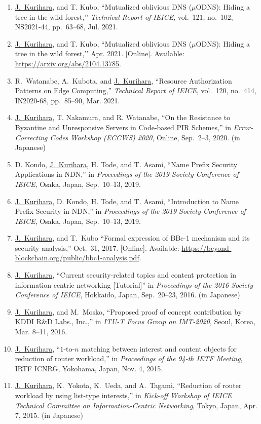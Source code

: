 \begin{enumerate}
 \item \underline{J.~Kurihara}, and T. Kubo, ``Mutualized oblivious DNS ($\mu$ODNS): Hiding a tree in the wild forest,’’ \textit{Technical Report of IEICE}, vol.~121, no.~102, NS2021-44, pp.~63--68, Jul. 2021.
 \item \underline{J.~Kurihara}, and T. Kubo, ``Mutualized oblivious DNS ($\mu$ODNS): Hiding a tree in the wild forest,’’ Apr. 2021. [Online]. Available: \url{https://arxiv.org/abs/2104.13785}.
\item R.~Watanabe, A.~Kubota, and \underline{J.~Kurihara}, ``Resource Authorization Patterns on Edge Computing,'' \textit{Technical Report of IEICE}, vol.~120, no.~414, IN2020-68, pp.~85--90, Mar. 2021.
 \item \underline{J.~Kurihara}, T. Nakamura, and R. Watanabe, ``On the Resistance to Byzantine and Unresponsive Servers in Code-based PIR Schemes,'' in \textit{Error-Correcting Codes Workshop (ECCWS) 2020}, Online, Sep.~2--3, 2020. (in Japanese)
 \item D. Kondo, \underline{J.~Kurihara}, H. Tode, and T. Asami, ``Name Prefix Security Applications in NDN,'' in \textit{Proceedings of the 2019 Society Conference of IEICE}, Osaka, Japan, Sep.~10--13, 2019.
 \item \underline{J.~Kurihara}, D. Kondo, H. Tode, and T. Asami, ``Introduction to Name Prefix Security in NDN,'' in \textit{Proceedings of the 2019 Society Conference of IEICE}, Osaka, Japan, Sep.~10--13, 2019.
 \item \underline{J.~Kurihara}, and T.~Kubo ``Formal expression of BBc-1 mechanism and its security analysis,'' Oct.~31, 2017. [Online]. Available: \url{https://beyond-blockchain.org/public/bbc1-analysis.pdf}.
 \item \underline{J.~Kurihara}, ``Current security-related topics and content protection in information-centric networking [Tutorial]'' in \textit{Proceedings of the 2016 Society Conference of IEICE}, Hokkaido, Japan, Sep.~20--23, 2016. (in Japanese)
 \item \underline{J.~Kurihara}, and M.~Mosko, ``Proposed proof of concept contribution by KDDI R\&D Labs., Inc.,'' in \textit{ITU-T Focus Group on IMT-2020}, Seoul, Korea, Mar. 8--11, 2016.
 \item \underline{J.~Kurihara}, ``$1$-to-$n$ matching between interest and content objects for reduction of router workload,'' in \textit{Proceedings of the 94-th IETF Meeting}, IRTF ICNRG, Yokohama, Japan, Nov. 4, 2015.
 \item \underline{J.~Kurihara}, K.~Yokota, K.~Ueda, and A.~Tagami, ``Reduction of router workload by using list-type interests,'' in \textit{Kick-off Workshop of IEICE Technical Committee on Information-Centric Networking}, Tokyo, Japan, Apr. 7, 2015. (in Japanese)

\end{enumerate}
